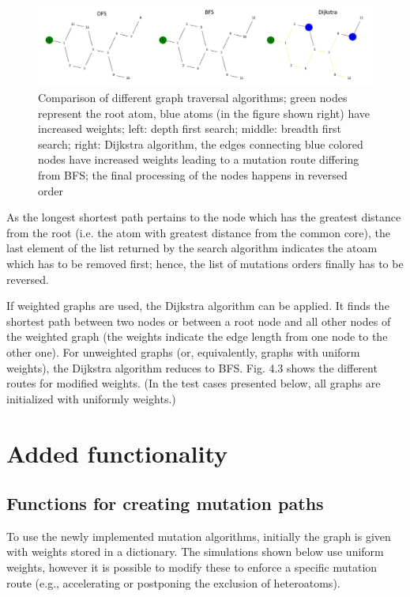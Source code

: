 \begin{figure}

\includegraphics[scale=0.45]{dfs_bfs_dijkstra_comp1}\caption{Comparison of different graph traversal algorithms; green nodes represent the root atom, blue atoms (in the figure shown right) have increased weights; left: depth first
search; middle: breadth first search; right: Dijkstra algorithm, the
edges connecting blue colored nodes have increased weights leading
to a mutation route differing from BFS; the final processing of the
nodes happens in reversed order}

\end{figure}

As the longest shortest path pertains to the node which has the greatest
distance from the root (i.e. the atom with greatest distance from
the common core), the last element of the list returned by the search algorithm indicates the atoam which has to be removed first; hence, the list of mutations orders finally has to be reversed.

If weighted graphs are used, the Dijkstra algorithm can be applied.
It finds the shortest path between two nodes or between a root node
and all other nodes of the weighted graph (the weights indicate the
edge length from one node to the other one). For unweighted graphs
(or, equivalently, graphs with uniform weights), the Dijkstra algorithm
reduces to BFS. Fig. 4.3 shows the different routes for modified weights.
(In the test cases presented below, all graphs are initialized with uniformly weights.)

\section{Added functionality}

\subsection{Functions for creating mutation paths}

To use the newly implemented mutation algorithms, initially the graph
is given with weights stored in a dictionary. The simulations shown
below use uniform weights, however it is possible to modify these to
enforce a specific mutation route (e.g., accelerating or postponing
the exclusion of heteroatoms). 

